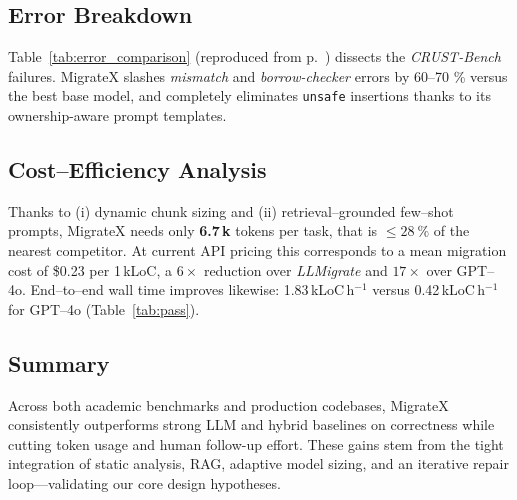 \documentclass[twocolumn]{article}
\begin{document}
    
    \subsection{Error Breakdown}
    \label{subsec:error}
    Table~\ref{tab:error_comparison} (reproduced from p.~\pageref{tab:error_comparison}) dissects the \emph{CRUST-Bench} failures.  
    MigrateX slashes \emph{mismatch} and \emph{borrow-checker} errors by 60–70 \% versus the best base model, and completely eliminates \texttt{unsafe} insertions thanks to its ownership-aware prompt templates.  
    
    \subsection{Cost--Efficiency Analysis}
\label{subsec:cost}
Thanks to (i) dynamic chunk sizing and (ii) retrieval--grounded few--shot
prompts, MigrateX needs only \textbf{6.7\,k} tokens per task,
that is \textit{\(\leq 28\ \%\)} of the nearest competitor.  
At current API pricing this corresponds to a mean migration cost of
\$0.23 per 1\,kLoC, a \textit{\(6\times\)} reduction over
\emph{LLMigrate} and \textit{\(17\times\)} over GPT--4o.  
End--to--end wall time improves likewise: 1.83\,kLoC\,h\(^{-1}\) versus
0.42\,kLoC\,h\(^{-1}\) for GPT--4o (Table~\ref{tab:pass}).

    
    \subsection{Summary}
    Across both academic benchmarks and production codebases, MigrateX consistently outperforms strong LLM and hybrid baselines on correctness while cutting token usage and human follow-up effort.  
    These gains stem from the tight integration of static analysis, RAG, adaptive model sizing, and an iterative repair loop—validating our core design hypotheses.
    
\end{document}
